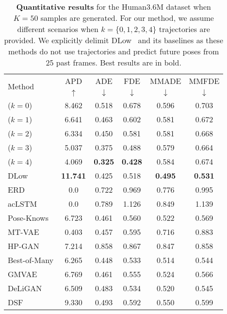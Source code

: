 \documentclass[10pt,twocolumn,letterpaper]{article}
\begin{document}
\begin{table}[t!]
\centering
\scriptsize
\begin{tabular}{lccccc}
    \toprule
         \multirow{2}{*}{Method}  & APD  & ADE  & FDE  & MMADE  & MMFDE  \\ 
         & $\uparrow$ & $\downarrow$ & $\downarrow$& $\downarrow$& $\downarrow$\\
    \midrule             
        \textbf{\trajevae{}} ($ k = 0$) & 8.462 &  0.518 &  0.678 &  0.596 &  0.703 \\
        \textbf{\trajevae{}} ($k = 1$) &              6.641 &           0.463 &           0.602 &           0.581 &           0.672 \\
        \textbf{\trajevae{}} ($k = 2$) &              6.334 &           0.450 &           0.581 &           0.581 &           0.668 \\
        \textbf{\trajevae{}} ($k = 3$) &              5.037 &           0.375 &           0.488 &           0.579 &           0.664 \\
        \textbf{\trajevae{}} ($k = 4$) &              4.069 &  \textbf{0.325} &  \textbf{0.428} &           0.584 &           0.674 \\
    \midrule
        DLow \cite{yuan2020dlow} & \textbf{11.741} & 0.425 &  0.518 & \bf 0.495 & \bf 0.531 \\
        ERD \cite{fragkiadaki2015recurrent} & 0.0  & 0.722 & 0.969 & 0.776 & 0.995 \\
        acLSTM \cite{li2017auto} & 0.0  & 0.789 & 1.126 & 0.849 & 1.139 \\
        Pose-Knows \cite{walker2017pose}& 6.723  & 0.461 & 0.560 & 0.522 & 0.569  \\
        MT-VAE \cite{yan2018mt}& 0.403  & 0.457 & 0.595 & 0.716 & 0.883 \\
        HP-GAN \cite{barsoum2018hp}& 7.214  & 0.858 & 0.867 & 0.847 & 0.858 \\
        Best-of-Many \cite{bhattacharyya2018accurate} & 6.265  & 0.448 & 0.533 & 0.514 & 0.544 \\
        GMVAE \cite{dilokthanakul2016deep} & 6.769  & 0.461 & 0.555 & 0.524 & 0.566 \\
        DeLiGAN \cite{gurumurthy2017deligan} & 6.509  & 0.483 & 0.534 & 0.520 & 0.545 \\
        DSF \cite{yuan2019diverse} & 9.330  & 0.493 & 0.592 & 0.550 & 0.599 \\
    \bottomrule
\end{tabular}
\caption{\textbf{Quantitative results} for the Human3.6M dataset when $K=50$ samples are generated.
For our method, we assume different scenarios when \mbox{$k=\{0, 1, 2, 3, 4\}$} trajectories are provided. We explicitly delimit DLow~\cite{yuan2020dlow} and its baselines as these methods do not use trajectories and predict future poses from 25 past frames. 
Best results are in bold.}
\label{tab:base-experiment}                                
\end{table}               
\end{document}
